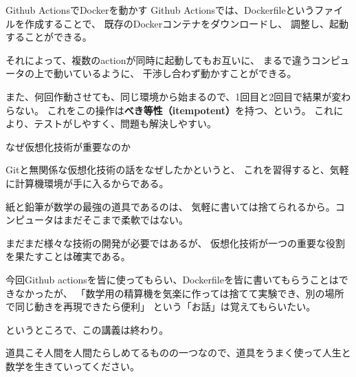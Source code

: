 \documentclass[12pt, unicode]{beamer}
\begin{document}
\begin{frame}{Github ActionsでDockerを動かす}
Github Actionsでは、Dockerfileというファイルを作成することで、
既存のDockerコンテナをダウンロードし、
調整し、起動することができる。

それによって、複数のactionが同時に起動してもお互いに、
まるで違うコンピュータの上で動いているように、
干渉し合わず動かすことができる。

また、何回作動させても、同じ環境から始まるので、1回目と2回目で結果が変わらない。
これをこの操作は\textbf{べき等性（itempotent）}を持つ、という。
これにより、テストがしやすく、問題も解決しやすい。


\end{frame}
\begin{frame}{なぜ仮想化技術が重要なのか}

Gitと無関係な仮想化技術の話をなぜしたかというと、
これを習得すると、気軽に計算機環境が手に入るからである。

紙と鉛筆が数学の最強の道具であるのは、
気軽に書いては捨てられるから。コンピュータはまだそこまで柔軟ではない。

まだまだ様々な技術の開発が必要ではあるが、
仮想化技術が一つの重要な役割を果たすことは確実である。

今回Github actionsを皆に使ってもらい、Dockerfileを皆に書いてもらうことはできなかったが、
「数学用の精算機を気楽に作っては捨てて実験でき、別の場所で同じ動きを再現できたら便利」
という「お話」は覚えてもらいたい。

というところで、この講義は終わり。

道具こそ人間を人間たらしめてるものの一つなので、道具をうまく使って人生と数学を生きていってください。

\end{frame}
\end{document}
